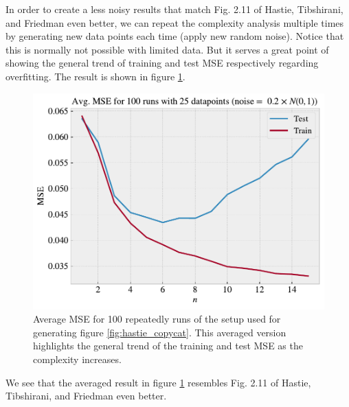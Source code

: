 \documentclass[norsk,a4paper,12pt]{scrartcl}
\begin{document}
In order to create a less noisy results that match Fig. 2.11 of Hastie, Tibshirani, and Friedman even better, we can repeat the complexity analysis multiple times by generating new data points each time (apply new random noise). Notice that this is normally not possible with limited data. But it serves a great point of showing the general trend of training and test MSE respectively regarding overfitting. The result is shown in figure \ref{fig:hastie_multi}.
\begin{figure}[H]
    \centering
    \includegraphics[width=0.8\linewidth]{figures/hastie_multi100.pdf}
    \caption{Average MSE for 100 repeatedly runs of the setup used for generating figure \ref{fig:hastie_copycat}. This averaged version highlights the general trend of the training and test MSE as the complexity increases.}
    \label{fig:hastie_multi}
\end{figure}
We see that the averaged result in figure \ref{fig:hastie_multi} resembles Fig. 2.11 of Hastie, Tibshirani, and Friedman even better.
\end{document}
